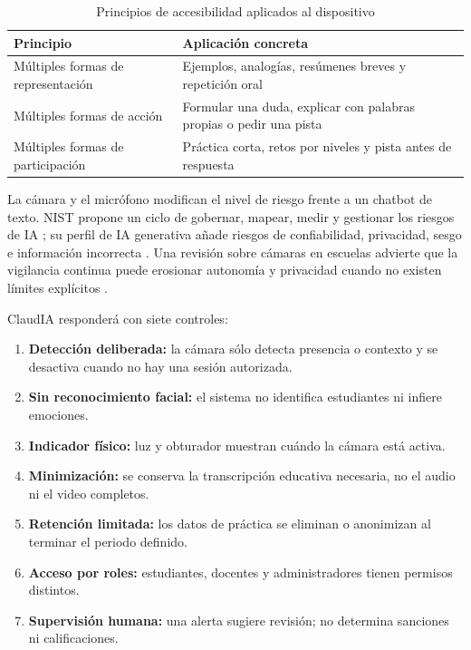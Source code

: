 \documentclass[11pt]{article}
\newcommand{\Section}[1]{\par\vspace{0.16\baselineskip}{\normalfont\normalsize\bfseries\RaggedRight #1\par}}
\begin{document}
\begin{table}[H]
\centering
\caption{Principios de accesibilidad aplicados al dispositivo}
\begin{tabularx}{\textwidth}{@{}lX@{}}
\toprule
\textbf{Principio} & \textbf{Aplicación concreta} \\
\midrule
Múltiples formas de representación & Ejemplos, analogías, resúmenes breves y repetición oral \\
Múltiples formas de acción & Formular una duda, explicar con palabras propias o pedir una pista \\
Múltiples formas de participación & Práctica corta, retos por niveles y pista antes de respuesta \\
\bottomrule
\end{tabularx}
\end{table}

\clearpage

\Section{Ética, privacidad y control}

La cámara y el micrófono modifican el nivel de riesgo frente a un chatbot de texto. NIST propone un ciclo de gobernar, mapear, medir y gestionar los riesgos de IA \cite{nist2023}; su perfil de IA generativa añade riesgos de confiabilidad, privacidad, sesgo e información incorrecta \cite{nist2024}. Una revisión sobre cámaras en escuelas advierte que la vigilancia continua puede erosionar autonomía y privacidad cuando no existen límites explícitos \cite{zulfiqar2026}.

ClaudIA responderá con siete controles:
\begin{enumerate}
  \item \textbf{Detección deliberada:} la cámara sólo detecta presencia o contexto y se desactiva cuando no hay una sesión autorizada.
  \item \textbf{Sin reconocimiento facial:} el sistema no identifica estudiantes ni infiere emociones.
  \item \textbf{Indicador físico:} luz y obturador muestran cuándo la cámara está activa.
  \item \textbf{Minimización:} se conserva la transcripción educativa necesaria, no el audio ni el video completos.
  \item \textbf{Retención limitada:} los datos de práctica se eliminan o anonimizan al terminar el periodo definido.
  \item \textbf{Acceso por roles:} estudiantes, docentes y administradores tienen permisos distintos.
  \item \textbf{Supervisión humana:} una alerta sugiere revisión; no determina sanciones ni calificaciones.
\end{enumerate}
\end{document}
